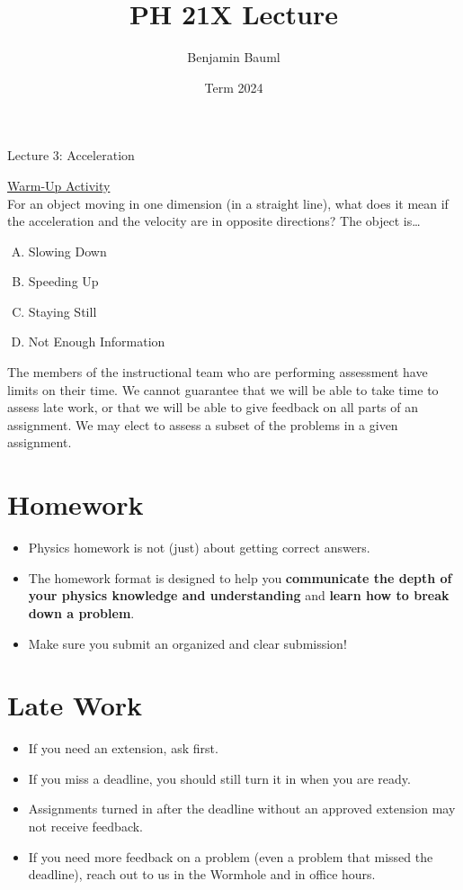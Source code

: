 \documentclass[]{article}
\title{PH 21X Lecture \Week}
\author{Benjamin Bauml}
\date{Term 2024}
\begin{document}
\begin{TeacherMargin}

\end{TeacherMargin}
\begin{PresentSpace}
\begin{center}
	\huge Lecture 3: Acceleration
\end{center}
\vspace{1cm}
\underline{Warm-Up Activity} \\
For an object moving in one dimension (in a straight line), what does it mean if the acceleration and the velocity are in opposite directions? The object is\dots
\begin{enumerate}[(A)]
	\item Slowing Down
	\item Speeding Up
	\item Staying Still
	\item Not Enough Information
\end{enumerate}
\end{PresentSpace}
\newpage
\begin{TeacherMargin}
The members of the instructional team who are performing assessment have limits on their time. We cannot guarantee that we will be able to take time to assess late work, or that we will be able to give feedback on all parts of an assignment. We may elect to assess a subset of the problems in a given assignment.
\end{TeacherMargin}
\begin{PresentSpace}
\section*{Homework}
\begin{itemize}
	\item Physics homework is not (just) about getting correct answers.
	\item The homework format is designed to help you \textbf{communicate the depth of your physics knowledge and	understanding} and \textbf{learn how to break down a problem}.
	\item Make sure you submit an organized and clear submission!
\end{itemize}
\vspace{2.5cm}
\section*{Late Work}
\begin{itemize}
	\item If you need an extension, ask first.
	\item If you miss a deadline, you should still turn it in when you are ready.
	\item Assignments turned in after the deadline without an approved extension may not receive feedback.
	\item If you need more feedback on a problem (even a problem that missed the deadline), reach out to us in the Wormhole and in office hours.
\end{itemize}
\end{PresentSpace}
\end{document}
